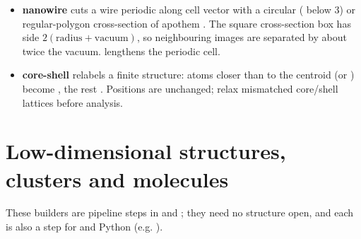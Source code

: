 \begin{itemize}
\item \textbf{nanowire} cuts a wire periodic along cell vector  with a circular ( below 3) or regular-polygon cross-section of apothem . The square cross-section box has side $2(\mathrm{radius}+\mathrm{vacuum})$, so neighbouring images are separated by about twice the vacuum.  lengthens the periodic cell.
\item \textbf{core-shell} relabels a finite structure: atoms closer than  to the centroid (or ) become , the rest . Positions are unchanged; relax mismatched core/shell lattices before analysis.
\end{itemize}

\section{Low-dimensional structures, clusters and molecules}\label{sec:low-dimensional}
These builders are pipeline steps in  and ; they need no structure open, and each is also a step for  and Python (e.g. ).
